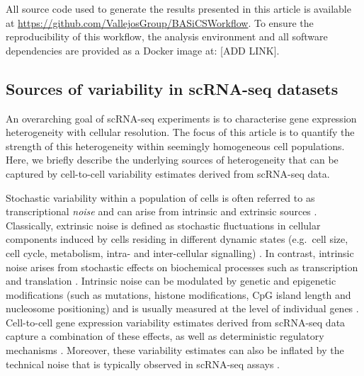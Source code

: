 \documentclass[9pt,a4paper,]{extarticle}
\begin{document}
All source code used to generate the results presented in this article is
available at \url{https://github.com/VallejosGroup/BASiCSWorkflow}. To ensure the
reproducibility of this workflow, the analysis environment and all software
dependencies are provided as a Docker \citep{Boettiger2014} image at: {[}ADD LINK{]}.

\newpage

\hypertarget{sources-of-variability-in-scrna-seq-datasets}{%
\subsection{Sources of variability in scRNA-seq datasets}\label{sources-of-variability-in-scrna-seq-datasets}}

An overarching goal of scRNA-seq experiments is to characterise gene expression
heterogeneity with cellular resolution.
The focus of this article is to quantify the strength of this heterogeneity
within seemingly homogeneous cell populations.
Here, we briefly describe the underlying sources of heterogeneity that can be
captured by cell-to-cell variability estimates derived from scRNA-seq data.

Stochastic variability within a population of cells is often referred to as
transcriptional \emph{noise} and can arise from intrinsic and extrinsic sources
\citep{Elowitz2002, Eling2019}.
Classically, extrinsic noise is defined as stochastic fluctuations in cellular
components induced by cells residing in different dynamic states (e.g.~cell
size, cell cycle, metabolism, intra- and inter-cellular signalling)
\citep{Zopf2013, Iwamoto2016, Kiviet2014}.
In contrast, intrinsic noise arises from stochastic effects on biochemical
processes such as transcription and translation \citep{Elowitz2002}.
Intrinsic noise can be modulated by genetic and epigenetic modifications (such
as mutations, histone modifications, CpG island length and nucleosome
positioning) \citep{Eberwine2015, Faure2017, Morgan2018} and is usually measured
at the level of individual genes \citep{Elowitz2002}.
Cell-to-cell gene expression variability estimates derived from scRNA-seq data
capture a combination of these effects, as well as deterministic regulatory
mechanisms \citep{Eling2019}.
Moreover, these variability estimates can also be inflated by the technical
noise that is typically observed in scRNA-seq assays \citep{Brennecke2013}.
\end{document}
